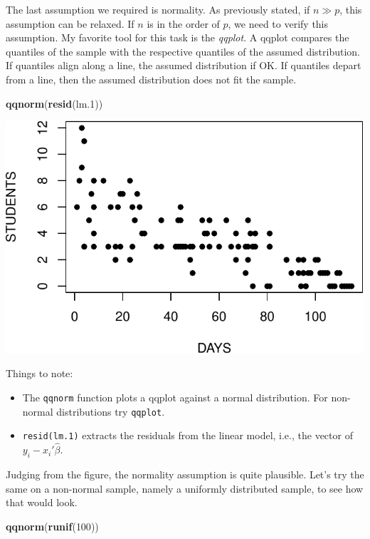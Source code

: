 \documentclass[]{book}
\newenvironment{Shaded}{\begin{snugshade}}{\end{snugshade}}
\newcommand{\KeywordTok}[1]{\textcolor[rgb]{0.13,0.29,0.53}{\textbf{#1}}}
\newcommand{\DecValTok}[1]{\textcolor[rgb]{0.00,0.00,0.81}{#1}}
\newcommand{\NormalTok}[1]{#1}
\providecommand{\tightlist}{%
  \setlength{\itemsep}{0pt}\setlength{\parskip}{0pt}}
\theoremstyle{definition}
\theoremstyle{definition}
\theoremstyle{definition}
\theoremstyle{remark}
\begin{document}
The last assumption we required is normality. As previously stated, if
\(n \gg p\), this assumption can be relaxed. If \(n\) is in the order of
\(p\), we need to verify this assumption. My favorite tool for this task
is the \emph{qqplot}. A qqplot compares the quantiles of the sample with
the respective quantiles of the assumed distribution. If quantiles align
along a line, the assumed distribution if OK. If quantiles depart from a
line, then the assumed distribution does not fit the sample.

\begin{Shaded}
\begin{Highlighting}[]
\KeywordTok{qqnorm}\NormalTok{(}\KeywordTok{resid}\NormalTok{(lm.}\DecValTok{1}\NormalTok{))}
\end{Highlighting}
\end{Shaded}

\includegraphics[width=0.5\linewidth]{Rcourse_files/figure-latex/unnamed-chunk-145-1}

Things to note:

\begin{itemize}
\tightlist
\item
  The \texttt{qqnorm} function plots a qqplot against a normal
  distribution. For non-normal distributions try \texttt{qqplot}.
\item
  \texttt{resid(lm.1)} extracts the residuals from the linear model,
  i.e., the vector of \(y_i-x_i'\hat \beta\).
\end{itemize}

Judging from the figure, the normality assumption is quite plausible.
Let's try the same on a non-normal sample, namely a uniformly
distributed sample, to see how that would look.

\begin{Shaded}
\begin{Highlighting}[]
\KeywordTok{qqnorm}\NormalTok{(}\KeywordTok{runif}\NormalTok{(}\DecValTok{100}\NormalTok{))}
\end{Highlighting}
\end{Shaded}
\end{document}
